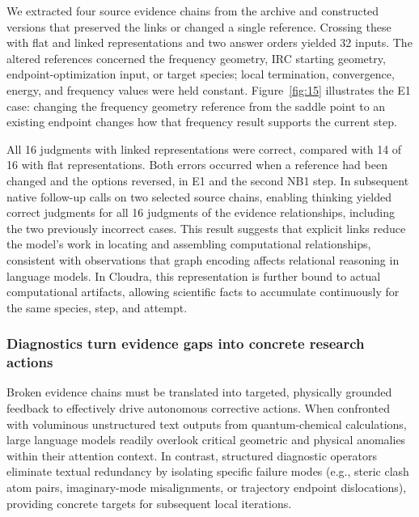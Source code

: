 We extracted four source evidence chains from the archive and constructed versions that preserved the links or changed a single reference. Crossing these with flat and linked representations and two answer orders yielded 32 inputs. The altered references concerned the frequency geometry, IRC starting geometry, endpoint-optimization input, or target species; local termination, convergence, energy, and frequency values were held constant. Figure~\ref{fig:15} illustrates the E1 case: changing the frequency geometry reference from the saddle point to an existing endpoint changes how that frequency result supports the current step.

All 16 judgments with linked representations were correct, compared with 14 of 16 with flat representations. Both errors occurred when a reference had been changed and the options reversed, in E1 and the second NB1 step. In subsequent native follow-up calls on two selected source chains, enabling thinking yielded correct judgments for all 16 judgments of the evidence relationships, including the two previously incorrect cases. 
\newpage
\noindent
This result suggests that explicit links reduce the model's work in locating and assembling computational relationships, consistent with observations that graph encoding affects relational reasoning in language models.\citep{ref17} In Cloudra, this representation is further bound to actual computational artifacts, allowing scientific facts to accumulate continuously for the same species, step, and attempt.

\subsubsection{Diagnostics turn evidence gaps into concrete research actions}

Broken evidence chains must be translated into targeted, physically grounded feedback to effectively drive autonomous corrective actions. When confronted with voluminous unstructured text outputs from quantum-chemical calculations, large language models readily overlook critical geometric and physical anomalies within their attention context. In contrast, structured diagnostic operators eliminate textual redundancy by isolating specific failure modes (e.g., steric clash atom pairs, imaginary-mode misalignments, or trajectory endpoint dislocations), providing concrete targets for subsequent local iterations.

